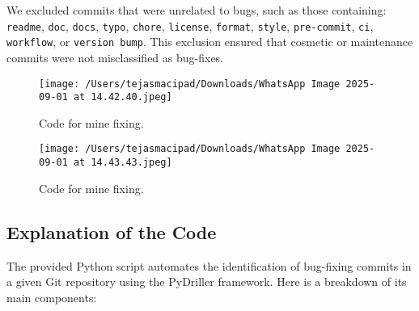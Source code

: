 \documentclass[12pt, a4paper]{report}
\begin{document}
We excluded commits that were unrelated to bugs, such as those containing: \texttt{readme}, \texttt{doc}, \texttt{docs}, \texttt{typo}, \texttt{chore}, \texttt{license}, \texttt{format}, \texttt{style}, \texttt{pre-commit}, \texttt{ci}, \texttt{workflow}, or \texttt{version bump}. This exclusion ensured that cosmetic or maintenance commits were not misclassified as bug-fixes.  

\begin{figure}[!h]
    \centering
    \texttt{[image: /Users/tejasmacipad/Downloads/WhatsApp Image 2025-09-01 at 14.42.40.jpeg]}
    \caption{Code for mine fixing.}
\end{figure}

\begin{figure}[!h]
    \centering
    \texttt{[image: /Users/tejasmacipad/Downloads/WhatsApp Image 2025-09-01 at 14.43.43.jpeg]}
    \caption{Code for mine fixing.}
\end{figure}

\subsection*{Explanation of the Code}

The provided Python script automates the identification of bug-fixing commits in a given Git repository using the PyDriller framework. Here is a breakdown of its main components:
\end{document}
